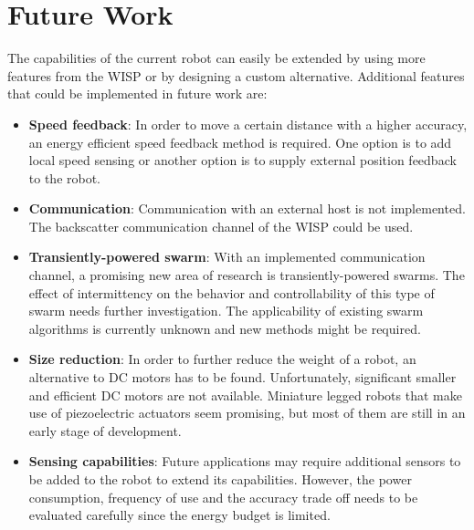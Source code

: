 \section{Future Work}
\label{sec:limitations_future_work}

The capabilities of the current robot can easily be extended by using more features from the WISP or by designing a custom alternative.
Additional features that could be implemented in future work are:

\begin{itemize}

\item \textbf{Speed feedback}: 
In order to move a certain distance with a higher accuracy, an energy efficient speed feedback method is required.
One option is to add local speed sensing or another option is to supply external position feedback to the robot.


\item \textbf{Communication}: 
Communication with an external host is not implemented.
The backscatter communication channel of the WISP could be used.

\item \textbf{Transiently-powered swarm}: 
With an implemented communication channel, a promising new area of research is transiently-powered swarms.
The effect of intermittency on the behavior and controllability of this type of swarm needs further investigation.
The applicability of existing swarm algorithms is currently unknown and new methods might be required.	

\item \textbf{Size reduction}: 
In order to further reduce the weight of a robot, an alternative to DC motors has to be found.
Unfortunately, significant smaller and efficient DC motors are not available.
Miniature legged robots that make use of piezoelectric actuators seem promising, but most of them are still in an early stage of development.

\item \textbf{Sensing capabilities}: 
Future applications may require additional sensors to be added to the robot to extend its capabilities.
However, the power consumption, frequency of use and the accuracy trade off needs to be evaluated carefully since the energy budget is limited.


\end{itemize}

